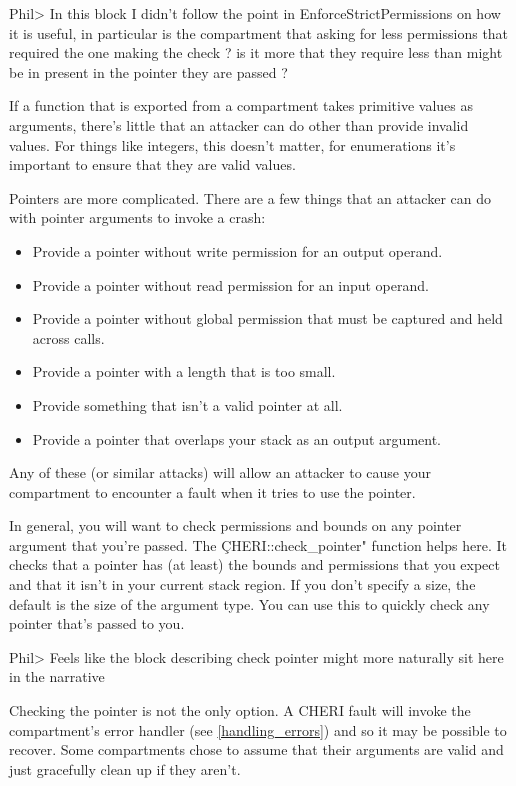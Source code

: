 Phil> In this block I didn't follow the point in EnforceStrictPermissions on how it is useful, in particular is the compartment that asking for less permissions that required the one making the check ?  is it more that they require less than might be in present in the pointer they are passed ? 

If a function that is exported from a compartment takes primitive values as arguments, there's little that an attacker can do other than provide invalid values.
For things like integers, this doesn't matter, for enumerations it's important to ensure that they are valid values.

Pointers are more complicated.
There are a few things that an attacker can do with pointer arguments to invoke a crash:

\begin{itemize}
	\item{Provide a pointer without write permission for an output operand.}
	\item{Provide a pointer without read permission for an input operand.}
	\item{Provide a pointer without global permission that must be captured and held across calls.}
	\item{Provide a pointer with a length that is too small.}
	\item{Provide something that isn't a valid pointer at all.}
	\item{Provide a pointer that overlaps your stack as an output argument.}
\end{itemize}

Any of these (or similar attacks) will allow an attacker to cause your compartment to encounter a fault when it tries to use the pointer.

In general, you will want to check permissions and bounds on any pointer argument that you're passed.
The \c{CHERI::check_pointer"} function helps here.
It checks that a pointer has (at least) the bounds and permissions that you expect and that it isn't in your current stack region.
If you don't specify a size, the default is the size of the argument type.
You can use this to quickly check any pointer that's passed to you.

Phil> Feels like the block describing check pointer might more naturally sit here in the narrative

\begin{note}
Checking the pointer is not the only option.
A CHERI fault will invoke the compartment's error handler (see \ref{handling_errors}) and so it may be possible to recover.
Some compartments chose to assume that their arguments are valid and just gracefully clean up if they aren't.
\end{note}

